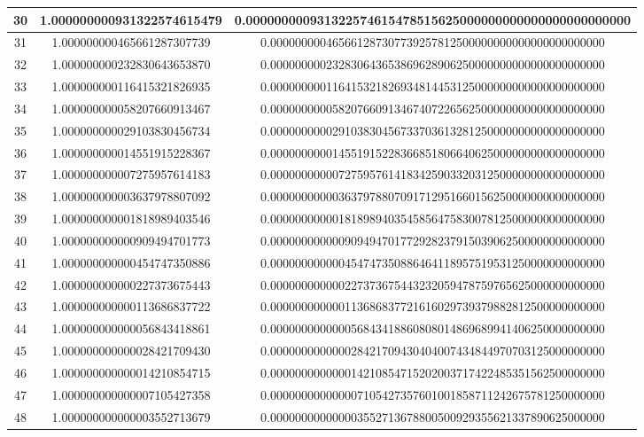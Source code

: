 \documentclass{article}
\begin{document}
\begin{itemize}
\begin{longtable}{|c||c|c|}
		30 & 1.000000000931322574615479 & 0.000000000931322574615478515625000000000000000000000000 \\ \hline 
		31 & 1.000000000465661287307739 & 0.000000000465661287307739257812500000000000000000000000 \\ \hline 
		32 & 1.000000000232830643653870 & 0.000000000232830643653869628906250000000000000000000000 \\ \hline 
		33 & 1.000000000116415321826935 & 0.000000000116415321826934814453125000000000000000000000 \\ \hline 
		34 & 1.000000000058207660913467 & 0.000000000058207660913467407226562500000000000000000000 \\ \hline 
		35 & 1.000000000029103830456734 & 0.000000000029103830456733703613281250000000000000000000 \\ \hline 
		36 & 1.000000000014551915228367 & 0.000000000014551915228366851806640625000000000000000000 \\ \hline 
		37 & 1.000000000007275957614183 & 0.000000000007275957614183425903320312500000000000000000 \\ \hline 
		38 & 1.000000000003637978807092 & 0.000000000003637978807091712951660156250000000000000000 \\ \hline 
		39 & 1.000000000001818989403546 & 0.000000000001818989403545856475830078125000000000000000 \\ \hline 
		40 & 1.000000000000909494701773 & 0.000000000000909494701772928237915039062500000000000000 \\ \hline 
		41 & 1.000000000000454747350886 & 0.000000000000454747350886464118957519531250000000000000 \\ \hline 
		42 & 1.000000000000227373675443 & 0.000000000000227373675443232059478759765625000000000000 \\ \hline 
		43 & 1.000000000000113686837722 & 0.000000000000113686837721616029739379882812500000000000 \\ \hline 
		44 & 1.000000000000056843418861 & 0.000000000000056843418860808014869689941406250000000000 \\ \hline 
		45 & 1.000000000000028421709430 & 0.000000000000028421709430404007434844970703125000000000 \\ \hline 
		46 & 1.000000000000014210854715 & 0.000000000000014210854715202003717422485351562500000000 \\ \hline 
		47 & 1.000000000000007105427358 & 0.000000000000007105427357601001858711242675781250000000 \\ \hline 
		48 & 1.000000000000003552713679 & 0.000000000000003552713678800500929355621337890625000000 \\ \hline 

\end{longtable}
\end{itemize}
\end{document}
